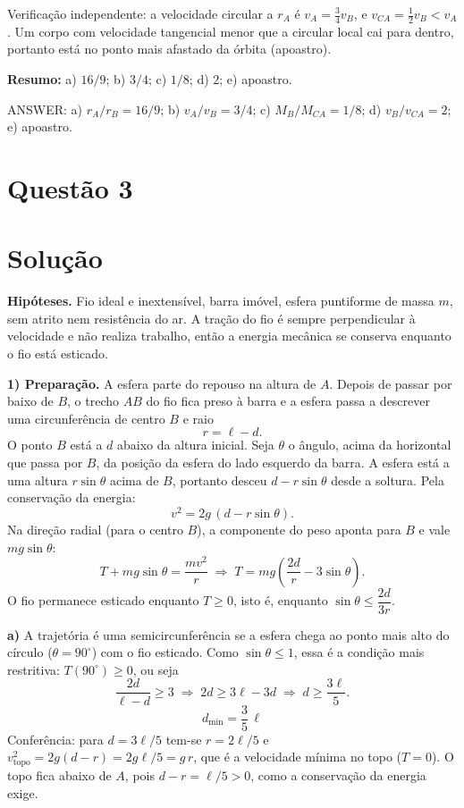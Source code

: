 \documentclass{article}%
\begin{document}
Verificação independente: a velocidade circular a $r_A$ é $v_A=\tfrac34v_B$, e $v_{CA}=\tfrac12v_B<v_A$. Um corpo com velocidade tangencial menor que a circular local cai para dentro, portanto está no ponto mais afastado da órbita (apoastro).

\medskip
\noindent\textbf{Resumo:} a) $16/9$; b) $3/4$; c) $1/8$; d) $2$; e) apoastro.

ANSWER: a) $r_A/r_B=16/9$; b) $v_A/v_B=3/4$; c) $M_B/M_{CA}=1/8$; d) $v_B/v_{CA}=2$; e) apoastro.%
\newpage%
\section*{Questão 3}

\section*{Solução}

\textbf{Hipóteses.} Fio ideal e inextensível, barra imóvel, esfera puntiforme de massa $m$, sem atrito nem resistência do ar. A tração do fio é sempre perpendicular à velocidade e não realiza trabalho, então a energia mecânica se conserva enquanto o fio está esticado.

\textbf{1) Preparação.} A esfera parte do repouso na altura de $A$. Depois de passar por baixo de $B$, o trecho $AB$ do fio fica preso à barra e a esfera passa a descrever uma circunferência de centro $B$ e raio
\[
r=\ell-d .
\]
O ponto $B$ está a $d$ abaixo da altura inicial. Seja $\theta$ o ângulo, acima da horizontal que passa por $B$, da posição da esfera do lado esquerdo da barra. A esfera está a uma altura $r\sin\theta$ acima de $B$, portanto desceu $d-r\sin\theta$ desde a soltura. Pela conservação da energia:
\[
v^2=2g\,(d-r\sin\theta).
\]
Na direção radial (para o centro $B$), a componente do peso aponta para $B$ e vale $mg\sin\theta$:
\[
T+mg\sin\theta=\frac{mv^2}{r}\;\Rightarrow\;
T=mg\left(\frac{2d}{r}-3\sin\theta\right).
\]
O fio permanece esticado enquanto $T\ge 0$, isto é, enquanto $\sin\theta\le \dfrac{2d}{3r}$.

\textbf{a)} A trajetória é uma semicircunferência se a esfera chega ao ponto mais alto do círculo ($\theta=90^\circ$) com o fio esticado. Como $\sin\theta\le1$, essa é a condição mais restritiva: $T(90^\circ)\ge0$, ou seja
\[
\frac{2d}{\ell-d}\ge 3\;\Longrightarrow\; 2d\ge 3\ell-3d\;\Longrightarrow\; d\ge\frac{3\ell}{5}.
\]
\[
\boxed{d_{\min}=\dfrac{3}{5}\,\ell}
\]
Conferência: para $d=3\ell/5$ tem-se $r=2\ell/5$ e $v_{\text{topo}}^2=2g(d-r)=2g\ell/5=g\,r$, que é a velocidade mínima no topo ($T=0$). O topo fica abaixo de $A$, pois $d-r=\ell/5>0$, como a conservação da energia exige.
\end{document}
